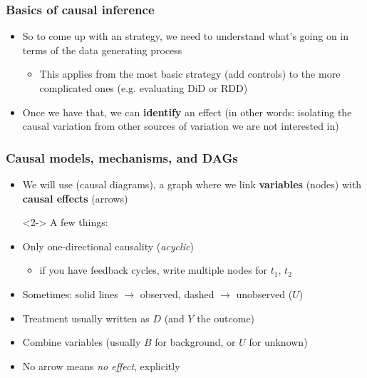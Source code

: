 \documentclass[aspectratio=43]{beamer}
\begin{document}
\begin{frame}
\frametitle{Basics of causal inference}
\centering

\begin{itemize}[<+->]
  \item So to come up with an strategy, we need to understand what's going on in terms of the data generating process
  \begin{itemize}
    \item This applies from the most basic strategy (add controls) to the more complicated ones (e.g. evaluating DiD or RDD)
  \end{itemize}
  \item Once we have that, we can \textbf{identify} an effect (in other words: isolating the causal variation from other sources of variation we are not interested in)
\end{itemize}

\end{frame}

\begin{frame}
\frametitle{Causal models, mechanisms, and DAGs}
\centering

\begin{itemize}
  \item We will use  (causal diagrams), a graph where we link \textbf{variables} (nodes) with \textbf{causal effects} (arrows)
  \item[]
  \item[]<2-> A few things:
  \item<3-> Only one-directional causality (\textit{acyclic})
  \begin{itemize}
    \item if you have feedback cycles, write multiple nodes for $t_{1}$, $t_{2}$
  \end{itemize}
  \item<4-> Sometimes: solid lines $\rightarrow$ observed, dashed $\rightarrow$ unobserved ($U$)
  \item<5-> Treatment usually written as $D$ (and $Y$ the outcome)
  \item<6-> Combine variables (usually $B$ for background, or $U$ for unknown)
  \item<7-> No arrow means \textit{no effect}, explicitly
\end{itemize}

\end{frame}
\end{document}

